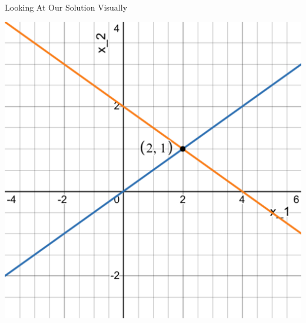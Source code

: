 \documentclass[xcoler=dvipsnames, aspectratio=169]{beamer}
\begin{document}
\begin{frame}{Looking At Our Solution Visually}
    \begin{center}
        \includegraphics[height=.75\textheight]{images/oneSolution.pdf}
    \end{center}
\end{frame}
\end{document}
